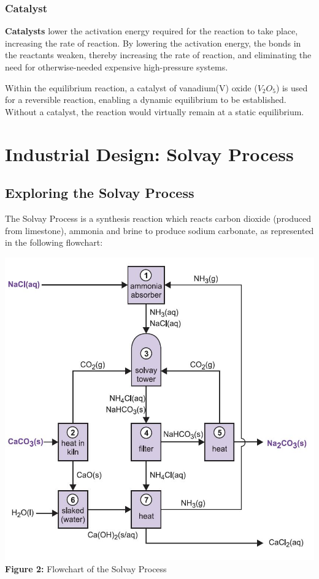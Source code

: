 \documentclass[12pt, a4paper]{article}
\begin{document}
\subsubsection{Catalyst}

\textbf{Catalysts} lower the activation energy required for the reaction to take place, increasing the rate of reaction. By lowering the activation energy, the bonds in the reactants weaken, thereby increasing the rate of reaction, and eliminating the need for otherwise-needed expensive high-pressure systems. 

Within the equilibrium reaction, a catalyst of vanadium(V) oxide (\(V_{2}O_{5}\)) is used for a reversible reaction, enabling a dynamic equilibrium to be established. Without a catalyst, the reaction would virtually remain at a static equilibrium.






\section{Industrial Design: Solvay Process}

\subsection{Exploring the Solvay Process}

The Solvay Process is a synthesis reaction which reacts carbon dioxide (produced from limestone), ammonia and brine to produce sodium carbonate, as represented in the following flowchart:

\begin{center}
\includegraphics[scale=0.6]{solvay.jpeg}
\\
\textbf{Figure 2:} Flowchart of the Solvay Process
\end{center}
\end{document}
